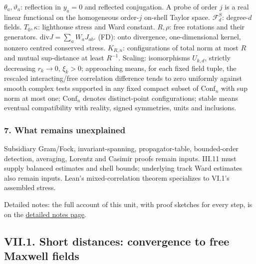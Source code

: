 \documentclass[
  letterpaper,
  11pt]{article}
\begin{document}
\(\theta_a,\vartheta_a\): reflection in \(y_a=0\) and reflected
conjugation. A probe of order \(j\) is a real linear functional on the
homogeneous order-\(j\) on-shell Taylor space. \(\mathcal F_d^S\):
degree-\(d\) fields. \(T_0,\kappa\): lighthouse stress and Ward
constant. \(R,\rho\): free rotations and their generators.
\(\mathrm{div}J=\sum_aW_aJ_{ab}\). (FD): onto divergence,
one-dimensional kernel, nonzero centred conserved stress. \(K_{R,n}\):
configurations of total norm at most \(R\) and mutual sup-distance at
least \(R^{-1}\). Scaling: isomorphisms \(U_{k,d}\), strictly decreasing
\(r_k\to0\), \(\xi_k>0\); approaching means, for each fixed field tuple,
the rescaled interacting/free correlation difference tends to zero
uniformly against smooth complex tests supported in any fixed compact
subset of \(\mathrm{Conf}_n\) with sup norm at most one;
\(\mathrm{Conf}_n\) denotes distinct-point configurations; stable means
eventual compatibility with reality, signed symmetries, units and
inclusions.

\subsubsection{7. What remains
unexplained}\label{what-remains-unexplained-24}

Subsidiary Gram/Fock, invariant-spanning, propagator-table,
bounded-order detection, averaging, Lorentz and Casimir proofs remain
inputs. III.11 must supply balanced estimates and shell bounds;
underlying track Ward estimates also remain inputs. Lean's
mixed-correlation theorem specializes to VI.1's assembled stress.

Detailed notes: the full account of this unit, with proof sketches for
every step, is on the
\href{https://github.com/scottnarmstrong/yang-mills-informalization/blob/main/outline/notes/VI-2.md}{detailed
notes page}.

\subsection{VII.1. Short distances: convergence to free Maxwell
fields}\label{vii.1.-short-distances-convergence-to-free-maxwell-fields}
\end{document}

